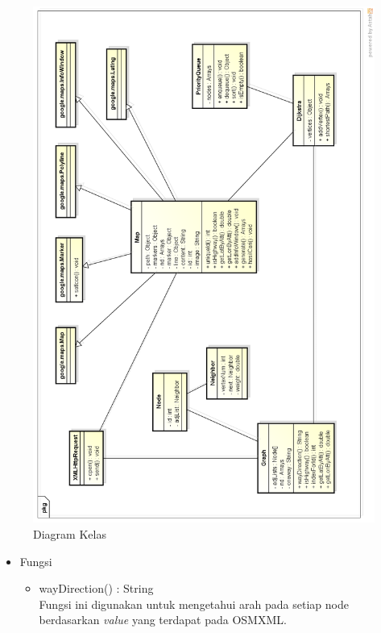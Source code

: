 \begin{itemize}
\begin{itemize}
\begin{itemize}
\begin{figure}[h]
\centering
\includegraphics[scale=0.6]{Gambar/perancangan_kelas}
\caption[Diagram Kelas]{Diagram Kelas}
\label{fig:perancangan_kelas}
\end{figure}
\clearpage
    \end{itemize}
  \end{itemize}
  \begin{itemize}
    \item Fungsi
    \begin{itemize}
      \item wayDirection() : String\\
      Fungsi ini digunakan untuk mengetahui arah pada setiap node berdasarkan
      \textit{value} yang terdapat pada OSMXML.
      

\end{itemize}
\end{itemize}
\end{itemize}
